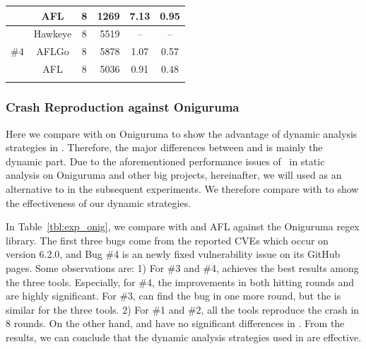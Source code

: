 \begin{table}[t]
\begin{tabular}{c|c|c|r|c|c}
        &        AFL   &            8                                          &                         1269                            &                     7.13                   &              0.95          \\ \hline
        \multirow{3}{*}{\#4}  & Hawkeye &      8                                                &                 5519                                    &              --                         & --                         \\ \cline{2-6} 
        &       AFLGo  &                8                                      &                 5878                                    &             1.07                                 &    0.57              \\ \cline{2-6} 
        &       AFL   &             8                                         &                 5036                                    &             0.91                              &    0.48                 \\ \thickhline          
    \end{tabular}  
\end{table}

\subsubsection{Crash Reproduction against Oniguruma}

Here we compare \dFOT with \dGO on Oniguruma to show the advantage of dynamic analysis strategies in \dFOT.
Therefore, the major differences between {\dFOT} and {\dGO} is mainly the dynamic part.
Due to the aforementioned performance issues of \aflgo~in static analysis on Oniguruma and other big projects, hereinafter, we will used \dGO as an alternative	to \aflgo in the subsequent experiments.
We therefore compare {\dFOT} with {\dGO} to show the effectiveness of our dynamic strategies.

In Table~\ref{tbl:exp_onig}, we compare \dFOT with \dGO and AFL against the Oniguruma regex library. The first three bugs come from the reported CVEs which occur on version 6.2.0, and Bug \#4 is an newly fixed vulnerability issue on its GitHub pages.
Some observations are: 
1) For \#3 and \#4,  \dFOT achieves the best results among the three tools. 
Especially, for \#4, the improvements in both hitting rounds and  {\utte} are highly significant. 
For \#3, \dFOT can find the bug in one more round, but the {\utte} is similar for the three tools.
2) For \#1 and \#2,  all the tools reproduce the crash in 8 rounds. On the other hand, \dFOT and \dGO have no significant differences in {\utte}.
From the results, we can conclude that the dynamic analysis strategies used in \dFOT are effective.



